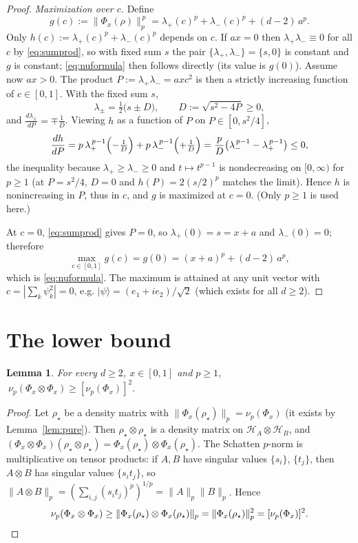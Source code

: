 \documentclass{amsart}
\newtheorem{lemma}{Lemma}
\theoremstyle{definition}
\newcommand{\HH}{\mathcal{H}}
\begin{document}
\begin{proof}
\emph{Maximization over $c$.} Define
\[
g(c):=\|\Phi_x(\rho)\|_p^{\,p}
=\lambda_+(c)^{p}+\lambda_-(c)^{p}+(d-2)\,a^{p}.
\]
Only $h(c):=\lambda_+(c)^{p}+\lambda_-(c)^{p}$ depends on $c$. If $ax=0$ then
$\lambda_+\lambda_-\equiv0$ for all $c$ by \eqref{eq:sumprod}, so with fixed sum
$s$ the pair $\{\lambda_+,\lambda_-\}=\{s,0\}$ is constant and $g$ is constant;
\eqref{eq:nuformula} then follows directly (its value is $g(0)$). Assume now
$ax>0$. The product $P:=\lambda_+\lambda_-=axc^{2}$ is then a strictly
increasing function of $c\in[0,1]$. With the fixed sum $s$,
\[
\lambda_\pm=\tfrac12\bigl(s\pm D\bigr),\qquad D:=\sqrt{s^{2}-4P}\ge0,
\]
and $\tfrac{d\lambda_\pm}{dP}=\mp\tfrac1D$. Viewing $h$ as a function of $P$ on
$P\in[0,s^2/4]$,
\[
\frac{dh}{dP}
=p\,\lambda_+^{\,p-1}\Bigl(-\tfrac1D\Bigr)
+p\,\lambda_-^{\,p-1}\Bigl(+\tfrac1D\Bigr)
=\frac{p}{D}\bigl(\lambda_-^{\,p-1}-\lambda_+^{\,p-1}\bigr)\le0 ,
\]
the inequality because $\lambda_+\ge\lambda_-\ge0$ and $t\mapsto t^{p-1}$ is
nondecreasing on $[0,\infty)$ for $p\ge1$ (at $P=s^2/4$, $D=0$ and
$h(P)=2(s/2)^p$ matches the limit). Hence $h$ is nonincreasing in $P$, thus in
$c$, and $g$ is maximized at $c=0$. (Only $p\ge1$ is used here.)

At $c=0$, \eqref{eq:sumprod} gives $P=0$, so $\lambda_+(0)=s=x+a$ and
$\lambda_-(0)=0$; therefore
\[
\max_{c\in[0,1]}g(c)=g(0)=(x+a)^{p}+(d-2)\,a^{p},
\]
which is \eqref{eq:nuformula}. The maximum is attained at any unit vector with
$c=|\sum_k\psi_k^{2}|=0$, e.g. $|\psi\rangle=(e_1+ie_2)/\sqrt2$ (which exists for
all $d\ge2$).
\end{proof}

\section{The lower bound}

\begin{lemma}\label{lem:lower}
For every $d\ge2$, $x\in[0,1]$ and $p\ge1$,
$\ \nu_p(\Phi_x\otimes\Phi_x)\ge[\nu_p(\Phi_x)]^{2}.$
\end{lemma}

\begin{proof}
Let $\rho_\star$ be a density matrix with
$\|\Phi_x(\rho_\star)\|_p=\nu_p(\Phi_x)$ (it exists by Lemma~\ref{lem:pure}).
Then $\rho_\star\otimes\rho_\star$ is a density matrix on $\HH_A\otimes\HH_B$,
and $(\Phi_x\otimes\Phi_x)(\rho_\star\otimes\rho_\star)
=\Phi_x(\rho_\star)\otimes\Phi_x(\rho_\star)$. The Schatten $p$-norm is
multiplicative on tensor products: if $A,B$ have singular values $\{s_i\}$,
$\{t_j\}$, then $A\otimes B$ has singular values $\{s_it_j\}$, so
$\|A\otimes B\|_p=(\sum_{i,j}(s_it_j)^p)^{1/p}=\|A\|_p\|B\|_p$. Hence
\[
\nu_p(\Phi_x\otimes\Phi_x)\ge
\|\Phi_x(\rho_\star)\otimes\Phi_x(\rho_\star)\|_p
=\|\Phi_x(\rho_\star)\|_p^{2}=[\nu_p(\Phi_x)]^{2}. \qedhere
\]
\end{proof}
\end{document}
